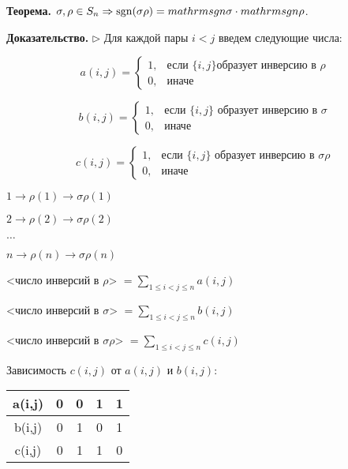 \vspace{\baselineskip}
\textbf{Теорема.} $\sigma, \rho \in S_n \Rightarrow \mathrm{sgn}(\sigma \rho) = \\mathrm{sgn} \sigma \cdot \\mathrm{sgn} \rho$.

\vspace{\baselineskip}
\textbf{Доказательство.} $\rhd$ Для каждой пары $i < j$ введем следующие числа:


\[
	a(i,j) = \begin{cases}
		1, &\text{если }  \{i, j \} \text{образует инверсию в } \rho \\
		0, &\text{иначе}
	\end{cases}
\]

\[
	b(i,j) = \begin{cases}
		1, &\text{если }  \{i, j \} \text{ образует инверсию в } \sigma \\
		0, &\text{иначе}
	\end{cases}
\]

\[
	c(i,j) = \begin{cases}
		1, &\text{если }  \{i, j \} \text{ образует инверсию в } \sigma \rho \\
		0, &\text{иначе}
	\end{cases}
\]

\vspace{\baselineskip}
$1 \rightarrow \rho (1) \rightarrow \sigma \rho (1)$

$2 \rightarrow \rho (2) \rightarrow \sigma \rho (2)$

$\dots$

$n \rightarrow \rho (n) \rightarrow \sigma \rho (n)$

\vspace{\baselineskip}
<число инверсий в $\rho$> $= \sum\limits_{1 \leq i < j \leq n} a(i, j) $

\vspace{\baselineskip}

<число инверсий в $\sigma$> $= \sum\limits_{1 \leq i < j \leq n} b(i, j) $

\vspace{\baselineskip}

<число инверсий в $\sigma \rho$> $= \sum\limits_{1 \leq i < j \leq n} c(i, j) $

\vspace{\baselineskip}
Зависимость $c(i,j)$ от $a(i,j)$ и $b(i,j)$:

\begin{table}[!ht]
		\begin{tabular}{c|c|c|c|c}
    	a(i,j) & 0 & 0 & 1 & 1 \\
        \hline
       b(i,j) & 0 & 1 & 0 & 1 \\
       \hline
          c(i,j) & 0 & 1 & 1 & 0 \\
		\end{tabular}
\end{table}

